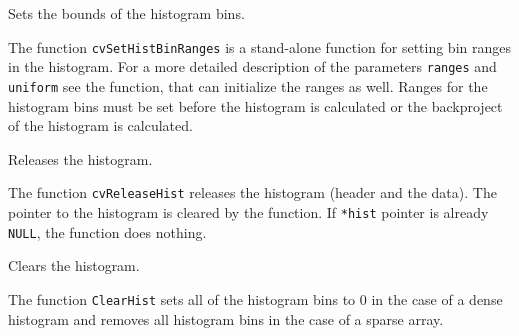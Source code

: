 \label{SetHistBinRanges}

Sets the bounds of the histogram bins.


\begin{description}
\end{description}

The function \texttt{cvSetHistBinRanges} is a stand-alone function for setting bin ranges in the histogram. For a more detailed description of the parameters \texttt{ranges} and \texttt{uniform} see the  function, that can initialize the ranges as well. Ranges for the histogram bins must be set before the histogram is calculated or the backproject of the histogram is calculated.


\label{ReleaseHist}

Releases the histogram.


\begin{description}
\end{description}

The function \texttt{cvReleaseHist} releases the histogram (header and the data). The pointer to the histogram is cleared by the function. If \texttt{*hist} pointer is already \texttt{NULL}, the function does nothing.

\label{ClearHist}

Clears the histogram.


\begin{description}
\end{description}

The function \texttt{ClearHist} sets all of the histogram bins to 0 in the case of a dense histogram and removes all histogram bins in the case of a sparse array.

\label{MakeHistHeaderForArray}

